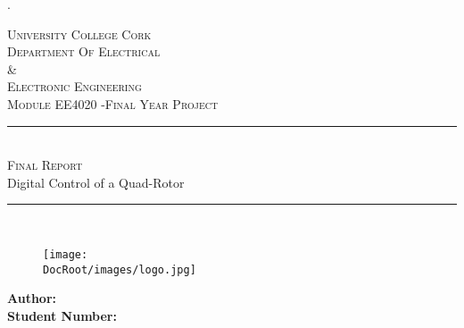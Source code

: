 
\begin{titlepage}





	{\color{white}.}
	
	\vspace{.5cm}
	
	
	
	
	\newcommand{\HRule}{\rule{\linewidth}{0.2mm}} %
	
	\centering %
	
	
	\textsc{\Huge University College Cork}\\[0.5cm] %
	\textsc{\Large  Department Of Electrical\\ \& \vspace{.3cm}\\Electronic Engineering}\\[0.5cm] %
	\textsc{\large Module EE4020 -Final Year Project} \\[0.5cm] %
	
	
	
	\vspace{.25cm}
	
	\HRule \\[0.10cm]
	{ \LARGE \textsc{Final Report}\\[.05cm]{\Large\textsc Digital Control of a Quad-Rotor}\\[.15cm]
	}%
	\HRule \\[1cm]
	
	\vspace{.50cm}
	
	
	
	\begin{figure}[th]
		\centering
		\texttt{[image: \\DocRoot/images/logo.jpg]}
		\label{fig:UCC_logo}
		
	\end{figure}
	
	
	
	\begin{minipage}{0.6\textwidth}
		\begin{flushleft} \large
			{\bf Author:}\\
			{\bf Student Number:}\\
			

\end{flushleft}
\end{minipage}
\end{titlepage}
